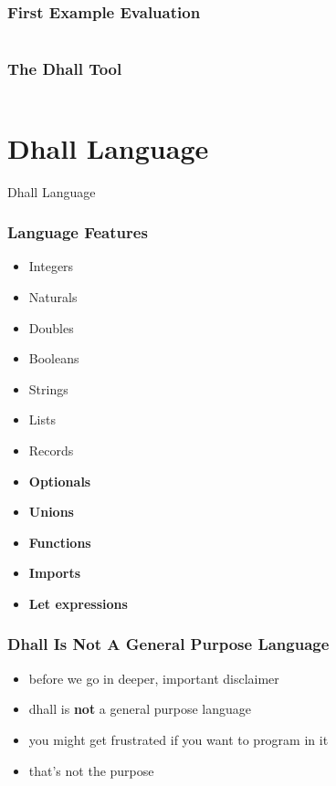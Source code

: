 \documentclass{beamer}
\begin{document}
\begin{frame}
  \frametitle{First Example \textemdash{} Evaluation}
  \inputminted[fontsize=\small]{text}{static-source/example.dhall.out}
\end{frame}

\begin{frame}
  \frametitle{The Dhall Tool}
  \inputminted[fontsize=\scriptsize]{text}{static-source/dhall-help.out}
\end{frame}

\section{Dhall Language}
\begin{frame}
  \begin{center}
    {\Huge Dhall Language}
  \end{center}
\end{frame}

\begin{frame}
  \frametitle{Language Features}
  \begin{itemize}
  \item Integers
  \item Naturals
  \item Doubles
  \item Booleans
  \item Strings
  \item Lists
  \item Records
  \item \textbf{Optionals}
  \item \textbf{Unions}
  \item \textbf{Functions}
  \item \textbf{Imports}
  \item \textbf{Let expressions}
  \end{itemize}
\end{frame}

\begin{frame}
  \frametitle{Dhall Is Not A General Purpose Language}
  \begin{itemize}
  \item before we go in deeper, important disclaimer
  \item dhall is \textbf{not} a general purpose language
  \item you might get frustrated if you want to program in it
  \item that's not the purpose
  \end{itemize}
\end{frame}
\end{document}
